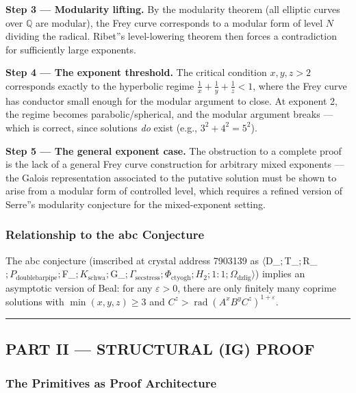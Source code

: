 \documentclass[12pt,a4paper]{article}
\begin{document}
\textbf{Step 3 --- Modularity lifting.} By the modularity theorem (all elliptic curves over $\mathbb{Q}$ are modular), the Frey curve corresponds to a modular form of level $N$ dividing the radical. Ribet''s level-lowering theorem then forces a contradiction for sufficiently large exponents.

\textbf{Step 4 --- The exponent threshold.} The critical condition $x, y, z > 2$ corresponds exactly to the hyperbolic regime $\frac{1}{x} + \frac{1}{y} + \frac{1}{z} < 1$, where the Frey curve has conductor small enough for the modular argument to close. At exponent 2, the regime becomes parabolic/spherical, and the modular argument breaks --- which is correct, since solutions \emph{do} exist (e.g., $3^2 + 4^2 = 5^2$).

\textbf{Step 5 --- The general exponent case.} The obstruction to a complete proof is the lack of a general Frey curve construction for arbitrary mixed exponents --- the Galois representation associated to the putative solution must be shown to arise from a modular form of controlled level, which requires a refined version of Serre''s modularity conjecture for the mixed-exponent setting.

\subsubsection{Relationship to the abc Conjecture}

The abc conjecture (imscribed at crystal address 7903139 as $\langle $D_{}$; $T_{}$; $R_{}$; P_{\text{doublebarpipe}}; $F_{}$; K_{\text{schwa}}; $G_{}$; \Gamma_{\text{secstress}}; \Phi_{\text{ctyogh}}; H_2; 1{:}1; \Omega_{\text{dzlig}} \rangle$) implies an asymptotic version of Beal: for any $\varepsilon > 0$, there are only finitely many coprime solutions with $\min(x,y,z) \geq 3$ and $C^z > \operatorname{rad}(A^x B^y C^z)^{1+\varepsilon}$.

\begin{center}
\rule{0.5\textwidth}{0.4pt}
\end{center}

\subsection{PART II --- STRUCTURAL (IG) PROOF}

\subsubsection{The Primitives as Proof Architecture}
\end{document}
